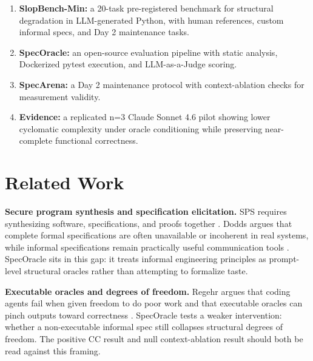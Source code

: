 \documentclass[11pt]{article}
\begin{document}
%
%
\begin{enumerate}[label=\arabic*.]
    \item \textbf{SlopBench-Min:} a 20-task pre-registered benchmark for
    structural degradation in LLM-generated Python, with human references,
    custom informal specs, and Day 2 maintenance tasks.
    \item \textbf{SpecOracle:} an open-source evaluation pipeline with static
    analysis, Dockerized pytest execution, and LLM-as-a-Judge scoring.
    \item \textbf{SpecArena:} a Day 2 maintenance protocol with
    context-ablation checks for measurement validity.
    \item \textbf{Evidence:} a replicated n=3 Claude Sonnet 4.6 pilot showing
    lower cyclomatic complexity under oracle conditioning while preserving
    near-complete functional correctness.
\end{enumerate}

\section{Related Work}

\textbf{Secure program synthesis and specification elicitation.}
SPS requires synthesizing software, specifications, and proofs together
\cite{VonHippel2026SPS}. Dodds argues that complete formal specifications are
often unavailable or incoherent in real systems, while informal specifications
remain practically useful communication tools \cite{Dodds2025Specs}.
SpecOracle sits in this gap: it treats informal engineering principles as
prompt-level structural oracles rather than attempting to formalize taste.

\textbf{Executable oracles and degrees of freedom.}
Regehr argues that coding agents fail when given freedom to do poor work and
that executable oracles can pinch outputs toward correctness
\cite{Regehr2026ZeroDOF}. SpecOracle tests a weaker intervention: whether a
non-executable informal spec still collapses structural degrees of freedom.
The positive CC result and null context-ablation result should both be read
against this framing.
\end{document}
